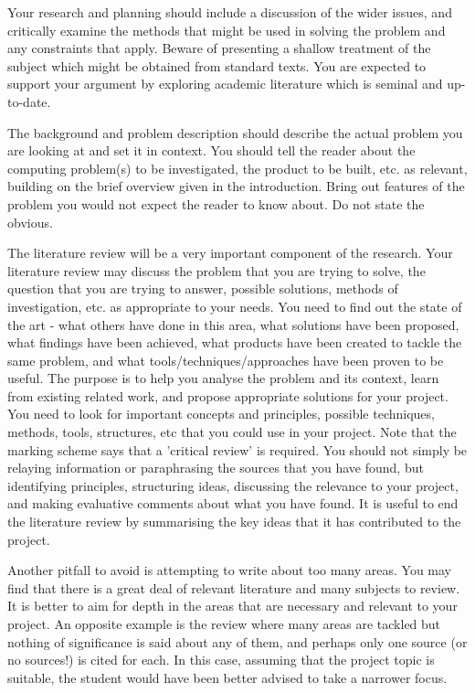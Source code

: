{    Your research and planning should include a discussion of the wider issues, and critically examine the methods that might be used in solving the problem and any constraints
    that apply. Beware of presenting a shallow treatment of the subject which might be obtained from standard texts. You are expected to support your argument by exploring
    academic literature which is seminal and up-to-date.

    The background and problem description should describe the actual problem you are looking at and set it in context. You should tell the reader about the computing problem(s)
    to be investigated, the product to be built, etc. as relevant, building on the brief overview given in the introduction. Bring out features of the problem you would not
    expect the reader to know about. Do not state the obvious.

    The literature review will be a very important component of the research. Your literature review may discuss the problem that you are trying to solve, the question that
    you are trying to answer, possible solutions, methods of investigation, etc. as appropriate to your needs. You need to find out the state of the art - what others have
    done in this area, what solutions have been proposed, what findings have been achieved, what products have been created to tackle the same problem, and what
    tools/techniques/approaches have been proven to be useful. The purpose is to help you analyse the problem and its context, learn from existing related work, and
    propose appropriate solutions for your project. You need to look for important concepts and principles, possible techniques, methods, tools, structures, etc that
    you could use in your project.
    Note that the marking scheme says that a 'critical review' is required. You should not simply be relaying information or paraphrasing the sources that you have found, but
    identifying principles, structuring ideas, discussing the relevance to your project, and making evaluative comments about what you have found. It is useful to end the
    literature review by summarising the key ideas that it has contributed to the project.

    Another pitfall to avoid is attempting to write about too many areas. You may find that there is a great deal of relevant literature and many subjects to review. It is
    better to aim for depth in the areas that are necessary and relevant to your project. An opposite example is the review where many areas are tackled but nothing
    of significance is said about any of them, and perhaps only one source (or no sources!) is cited for each. In this case, assuming that the project topic is suitable, the
    student would have been better advised to take a narrower focus.

}
